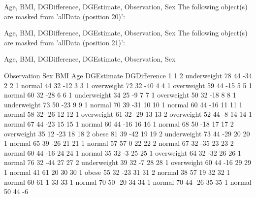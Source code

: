 \begin{Schunk}
\begin{Soutput}
    Age, BMI, DGDifference, DGEstimate, Observation, Sex
The following object(s) are masked from 'allData (position 20)':

    Age, BMI, DGDifference, DGEstimate, Observation, Sex
The following object(s) are masked from 'allData (position 21)':

    Age, BMI, DGDifference, DGEstimate, Observation, Sex
\end{Soutput}
\begin{Soutput}
    Observation Sex         BMI Age DGEstimate DGDifference
1             1   2 underweight  78         44          -34
2             2   1      normal  44         32          -12
3             3   1  overweight  72         32          -40
4             4   1  overweight  59         44          -15
5             5   1      normal  60         32          -28
6             6   1 underweight  34         25           -9
7             7   1  overweight  50         32          -18
8             8   1 underweight  73         50          -23
9             9   1      normal  70         39          -31
10           10   1      normal  60         44          -16
11           11   1      normal  58         32          -26
12           12   1  overweight  61         32          -29
13           13   2  overweight  52         44           -8
14           14   1      normal  67         44          -23
15           15   1      normal  60         44          -16
16           16   1      normal  68         50          -18
17           17   2  overweight  35         12          -23
18           18   2       obese  81         39          -42
19           19   2 underweight  73         44          -29
20           20   1      normal  65         39          -26
21           21   1      normal  57         57            0
22           22   2      normal  67         32          -35
23           23   2      normal  60         44          -16
24           24   1      normal  35         32           -3
25           25   1  overweight  64         32          -32
26           26   1      normal  76         32          -44
27           27   2 underweight  39         32           -7
28           28   1  overweight  60         44          -16
29           29   1      normal  41         61           20
30           30   1       obese  55         32          -23
31           31   2      normal  38         57           19
32           32   1      normal  60         61            1
33           33   1      normal  70         50          -20
34           34   1      normal  70         44          -26
35           35   1      normal  50         44           -6

\end{Soutput}
\end{Schunk}
